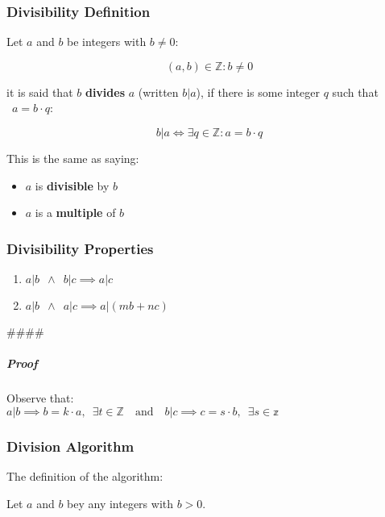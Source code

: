 \documentclass[
]{article}
\begin{document}
\hypertarget{header-n80}{%
\subsubsection{Divisibility Definition}\label{header-n80}}

Let \(a\) and \(b\) be integers with \(b \neq 0\):

\[(a,b) \in \mathbb{Z} : b \neq 0\]

it is said that \(b\) \textbf{divides} \(a\) (written \(b|a\)), if there
is some integer \(q\) such that \(\enspace a = b\cdot q\):

\[b|a \iff \exists q \in \mathbb{Z} : a = b\cdot q\]

This is the same as saying:

\begin{itemize}
\item
  \(a\) is \textbf{divisible} by \(b\)
\item
  \(a\) is a \textbf{multiple} of \(b\)
\end{itemize}

\hypertarget{header-n91}{%
\subsubsection{Divisibility Properties}\label{header-n91}}

\begin{enumerate}
\def\labelenumi{\arabic{enumi}.}
\item
  \(a|b \enspace  \wedge \enspace b|c \implies a|c\)
\item
  \(a|b \enspace \wedge \enspace a|c \implies a|(mb + nc)\)
\end{enumerate}

\#\#\#\#

\hypertarget{header-n98}{%
\subparagraph{Proof}\label{header-n98}}

Observe that:\\
\(a|b \implies b = k\cdot a, \enspace \exists t \in \mathbb{Z} \quad \text{and} \quad b|c \implies c = s \cdot b, \enspace \exists s \in \mathbb{z}\)

\hypertarget{header-n100}{%
\subsubsection{Division Algorithm}\label{header-n100}}

The definition of the algorithm:

Let \(a\) and \(b\) bey any integers with \(b >0\).
\end{document}
